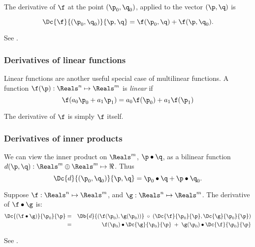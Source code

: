 The derivative of $\f$
at the point $(\p_0,\q_0)$, applied to the vector $(\p,\q)$ is

\begin{equation}
\Dc{\f}{(\p_0,\q_0)}{\p,\q} = \f(\p_0,\q) + \f(\p,\q_0).
\end{equation}

See \cite[ex.~2-12]{Spivak:1965:CalculusOnManifolds}.


\subsubsection{Derivatives of linear functions}
\label{sec:Derivatives-of-linear-functions}

Linear functions are another useful special case of multilinear functions.
A function $\f(\p):\Reals^{n} \mapsto \Reals^m$
is {\it linear} if
\begin{equation}
\f(a_0 \p_0 + a_1 \p_1)
 =
a_0 \f(\p_0) + a_1 \f(\p_1)
\end{equation}

The derivative of $\f$ is simply $\f$ itself.


\subsubsection{Derivatives of inner products}
\label{sec:inner}

We can view the inner product on $\Reals^m$, $\p \bullet \q$,
as a bilinear function $d(\p,\q) : \Reals^m \oplus \Reals^m \mapsto \Re$.
Thus
\begin{equation}
\Dc{d}{(\p_0,\q_0)}{\p,\q} = \p_0 \bullet \q + \p \bullet \q_0.
\end{equation}

Suppose
$\f:\Reals^{n} \mapsto \Reals^{m}$, and
$\g:\Reals^{n} \mapsto \Reals^{m}$.
The derivative of $\f \bullet \g$ is:
\begin{eqnarray}
\label{eq:dot_derivative}
\Dc{(\f \bullet \g)}{\p_0}{\p}
& =
& \Db{d}{(\f(\p_0),\g(\p_0))} \;\circ \;(\Dc{\f}{\p_0}{\p}, \Dc{\g}{\p_0}{\p})
\\
& =
& \f(\p_0) \bullet \Dc{\g}{\p_0}{\p} \; + \; \g(\p_0) \bullet \Dc{\f}{\p_0}{\p} \nonumber
\end{eqnarray}

See \cite[ex.~2-13]{Spivak:1965:CalculusOnManifolds}.



